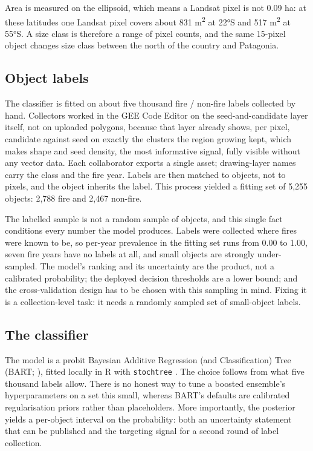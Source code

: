 \documentclass[11pt,a4paper]{article}
\begin{document}
Area is measured on the ellipsoid, which means a Landsat pixel is not 0.09 ha: at these latitudes one
Landsat pixel covers about 831 m\textsuperscript{2} at 22°S and 517 m\textsuperscript{2} at 55°S.
A size class is therefore a range of pixel counts, and the same 15-pixel object changes size class
between the north of the country and Patagonia.

\subsection{Object labels}\label{sec-objlabels}

The classifier is fitted on about five thousand fire / non-fire labels collected by hand.
Collectors worked in the GEE Code Editor on the seed-and-candidate layer itself, not on uploaded
polygons, because that layer already shows, per pixel, candidate against seed on exactly the
clusters the region growing kept, which makes shape and seed density, the most informative signal,
fully visible without any vector data. Each collaborator exports a single asset; drawing-layer
names carry the class and the fire year. Labels are then matched to objects, not to pixels, and
the object inherits the label. This process yielded a fitting set of 5,255 objects:
2,788 fire and 2,467 non-fire.

The labelled sample is not a random sample of objects, and this single fact conditions every
number the model produces. Labels were collected where fires were known to be, so per-year
prevalence in the fitting set runs from 0.00 to 1.00, seven fire years have no labels at all, and
small objects are strongly under-sampled. The model's ranking and its uncertainty are the product,
not a calibrated probability; the deployed decision thresholds are a lower bound; and the
cross-validation design has to be chosen with this sampling in mind. Fixing it is a collection-level
task: it needs a randomly sampled set of small-object labels.

\subsection{The classifier}\label{sec-objmodel}

The model is a probit Bayesian Additive Regression (and Classification) Tree (BART; \cite{chipman2010bart,albert1993probit}), 
fitted locally in R with
\texttt{stochtree} \parencite{stochtree}. The choice follows from what five thousand labels allow.
There is no honest way to tune a boosted ensemble's hyperparameters on a set this small, whereas
BART's defaults are calibrated regularisation priors rather than placeholders. More importantly,
the posterior yields a per-object interval on the probability: both an uncertainty statement that
can be published and the targeting signal for a second round of label collection. 
\end{document}
